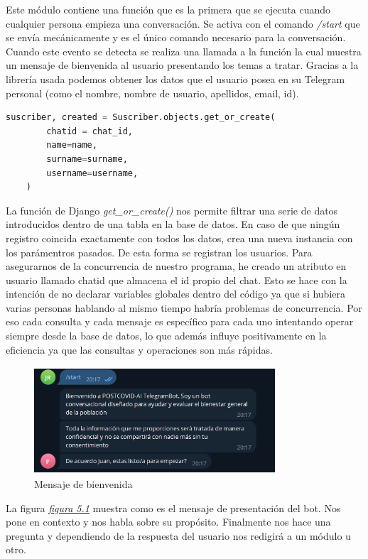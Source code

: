 Este módulo contiene una función que es la primera que se ejecuta cuando cualquier persona empieza una conversación. Se activa con el comando \textit{/start} que se envía mecánicamente y es el único comando necesario para la conversación. Cuando este evento se detecta se realiza una llamada a la función la cual muestra un mensaje de bienvenida al usuario presentando los temas a tratar. Gracias a la librería usada podemos obtener los datos que el usuario posea en su Telegram personal (como el nombre, nombre de usuario, apellidos, email, id).\vspace{0.3cm}

\begin{lstlisting}[language=Python]
    suscriber, created = Suscriber.objects.get_or_create(
        chatid = chat_id,
        name=name,
        surname=surname,
        username=username,
    )
\end{lstlisting}

 La función de Django \textit{get\_or\_create()} nos permite filtrar una serie de datos introducidos dentro de una tabla en la base de datos. En caso de que ningún registro coincida exactamente con todos los datos, crea una nueva instancia con los parámentros pasados. De esta forma se registran los usuarios. Para asegurarnos de la concurrencia de nuestro programa, he creado un atributo en usuario llamado chatid que almacena el id propio del chat. Esto se hace con la intención de no declarar variables globales dentro del código ya que si hubiera varias personas hablando al mismo tiempo habría problemas de concurrencia. Por eso cada consulta y cada mensaje es específico para cada uno intentando operar siempre desde la base de datos, lo que además influye positivamente en la eficiencia ya que las consultas y operaciones son más rápidas.


\begin{figure}[!ht]
    \centering
    \includegraphics[width=0.8\textwidth, height=4cm]{imagenes/welcome.png}
    \caption{ Mensaje de bienvenida }
    \label{fig:welcome}
\end{figure}

La figura \textit{\hyperref[fig:welcome]{figura 5.1}} muestra como es el mensaje de presentación del bot. Nos pone en contexto y nos habla sobre su propósito. Finalmente nos hace una pregunta y dependiendo de la respuesta del usuario nos redigirá a un módulo u otro. 

